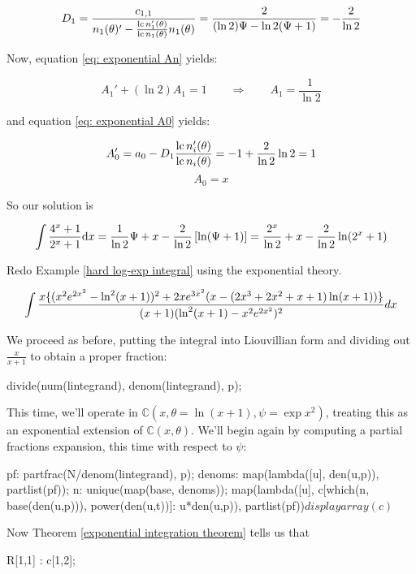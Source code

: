 $$ D_1 = \frac{c_{1,1}}{n_1(\theta)' - \frac{{\rm lc\,} n_1'(\theta)}{{\rm lc\,} n_1(\theta)} n_1(\theta)} = \frac{2}{(\ln 2) \Psi - \ln 2 (\Psi +1 )} = -\frac{2}{\ln 2}$$

Now, equation \eqref{eq: exponential An} yields:

$$A_1' + (\ln 2) A_1 = 1 \qquad\Longrightarrow\qquad A_1 = \frac{1}{\ln 2}$$

and equation \eqref{eq: exponential A0} yields:

$$A_0' = a_0 - D_1 \frac{{\rm lc\,} n_i'(\theta)}{{\rm lc\,} n_i(\theta)} = -1 + \frac{2}{\ln 2} \ln 2 = 1$$
$$A_0 = x$$

So our solution is

$$\int {{4^x+1}\over{2^x+1}} {\rm d}x = \frac{1}{\ln 2}\Psi + x  - \frac{2}{\ln 2}\left[\ln(\Psi+1)\right] =
\frac{2^x}{\ln 2} + x - \frac{2}{\ln 2}\ln(2^x+1) $$

\endexample

\vfill\eject

\example
Redo Example \ref{hard log-exp integral} using the exponential theory.

$$\int{{x\{(x^2e^{2x^2}-\ln^2(x+1))^2+2xe^{3x^2}(x-(2x^3+2x^2+x+1)\ln(x+1))\}}\over{(x+1)(\ln^2(x+1) - x^2e^{2x^2})^2}} dx$$

We proceed as before, putting the integral into Liouvillian form
and dividing out $\frac{x}{x+1}$ to obtain a proper fraction:

\begin{maximacode}
divide(num(lintegrand), denom(lintegrand), p);
\end{maximacode}

This time, we'll operate in ${\mathbb C}(x,\theta = \ln (x+1),\psi = \exp x^2)$, treating
this as an exponential extension of ${\mathbb C}(x,\theta)$.  We'll begin again by
computing a partial fractions expansion, this time with respect to $\psi$:

\begin{maximacode}
pf: partfrac(N/denom(lintegrand), p);
denoms: map(lambda([u], den(u,p)),
            partlist(pf));
n: unique(map(base, denoms));
map(lambda([u],
       c[which(n, base(den(u,p))),
         power(den(u,t))]: u*den(u,p)),
    partlist(pf))$
displayarray(c)$
\end{maximacode}

Now Theorem \ref{exponential integration theorem} tells us that

\begin{maximacode}
R[1,1] : c[1,2];
\end{maximacode}

